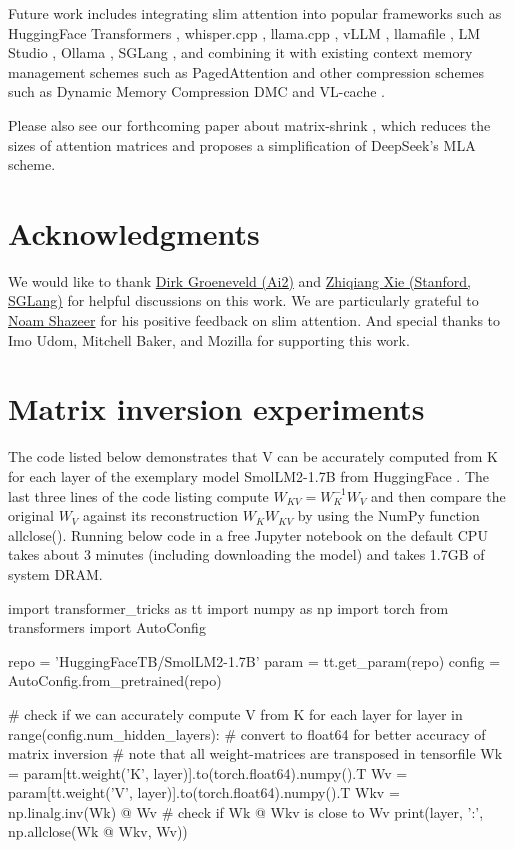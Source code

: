 \documentclass{article}
\begin{document}
Future work includes integrating slim attention into popular frameworks such as HuggingFace Transformers \citep{HFtransformers}, whisper.cpp \citep{whisper-cpp}, llama.cpp \citep{llama-cpp}, vLLM \citep{vLLM}, llamafile \citep{llamafile}, LM Studio \citep{lmstudio}, Ollama \citep{ollama}, SGLang \citep{sglang}, and combining it with existing context memory management schemes such as PagedAttention \citep{pagedAttn} and other compression schemes such as Dynamic Memory Compression DMC \citep{DMC} and VL-cache \citep{VL-cache}.

Please also see our forthcoming paper about matrix-shrink \citep{matShrink}, which reduces the sizes of attention matrices and proposes a simplification of DeepSeek's MLA scheme.

\section*{Acknowledgments}
We would like to thank \href{https://scholar.google.com/citations?user=KEhvGNMAAAAJ&hl=en}{Dirk Groeneveld (Ai2)} and \href{https://scholar.google.com/citations?user=Be2fl8sAAAAJ&hl=en}{Zhiqiang Xie (Stanford, SGLang)} for helpful discussions on this work. We are particularly grateful to \href{https://scholar.google.com/citations?user=wsGvgA8AAAAJ&hl=en}{Noam Shazeer} for his positive feedback on slim attention. And special thanks to Imo Udom, Mitchell Baker, and Mozilla for supporting this work.

\appendix

\section{Matrix inversion experiments}
The code listed below demonstrates that V can be accurately computed from K for each layer of the exemplary model SmolLM2-1.7B from HuggingFace \citep{smollm}. The last three lines of the code listing compute $W_{KV} = W_K^{-1} W_V$ and then compare the original $W_V$ against its reconstruction $W_K W_{KV}$ by using the NumPy function allclose(). Running below code in a free Jupyter notebook on the default CPU takes about 3 minutes (including downloading the model) and takes 1.7GB of system DRAM.

\begin{python}
import transformer_tricks as tt
import numpy as np
import torch
from transformers import AutoConfig

repo = 'HuggingFaceTB/SmolLM2-1.7B'
param = tt.get_param(repo)
config = AutoConfig.from_pretrained(repo)

# check if we can accurately compute V from K for each layer
for layer in range(config.num_hidden_layers):
  # convert to float64 for better accuracy of matrix inversion
  # note that all weight-matrices are transposed in tensorfile
  Wk = param[tt.weight('K', layer)].to(torch.float64).numpy().T
  Wv = param[tt.weight('V', layer)].to(torch.float64).numpy().T
  Wkv = np.linalg.inv(Wk) @ Wv
  # check if Wk @ Wkv is close to Wv
  print(layer, ':', np.allclose(Wk @ Wkv, Wv))
\end{python}
\end{document}
